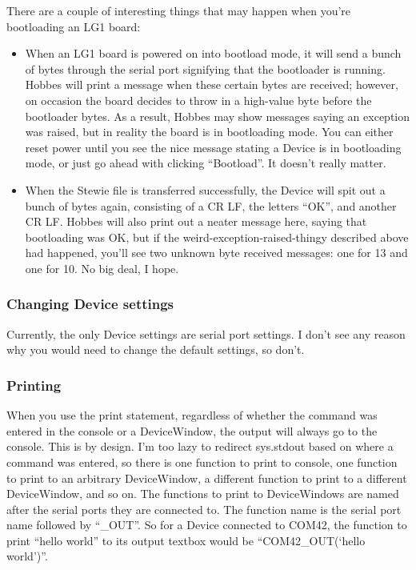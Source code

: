 There are a couple of interesting things that may happen when you're bootloading an LG1 board:

\begin{itemize}
\item When an LG1 board is powered on into bootload mode, it will send a bunch of bytes through the serial port signifying that the bootloader is running. Hobbes will print a message when these certain bytes are received; however, on occasion the board decides to throw in a high-value byte before the bootloader bytes. As a result, Hobbes may show messages saying an exception was raised, but in reality the board is in bootloading mode. You can either reset power until you see the nice message stating a Device is in bootloading mode, or just go ahead with clicking ``Bootload''. It doesn't really matter.

\item When the Stewie file is transferred successfully, the Device will spit out a bunch of bytes again, consisting of a CR LF, the letters ``OK'', and another CR LF. Hobbes will also print out a neater message here, saying that bootloading was OK, but if the weird-exception-raised-thingy described above had happened, you'll see two unknown byte received messages: one for 13 and one for 10. No big deal, I hope.
\end{itemize}



%
%
\subsubsection{Changing Device settings}
\label{3.2.8}

Currently, the only Device settings are serial port settings. I don't see any reason why you would need to change the default settings, so don't.



%
%
\subsubsection{Printing}
\label{3.2.9}

When you use the print statement, regardless of whether the command was entered in the console or a DeviceWindow, the output will always go to the console. This is by design. I'm too lazy to redirect sys.stdout based on where a command was entered, so there is one function to print to console, one function to print to an arbitrary DeviceWindow, a different function to print to a different DeviceWindow, and so on. The functions to print to DeviceWindows are named after the serial ports they are connected to. The function name is the serial port name followed by ``\_OUT''. So for a Device connected to COM42, the function to print ``hello world'' to its output textbox would be ``COM42\_OUT(`hello world')''.

